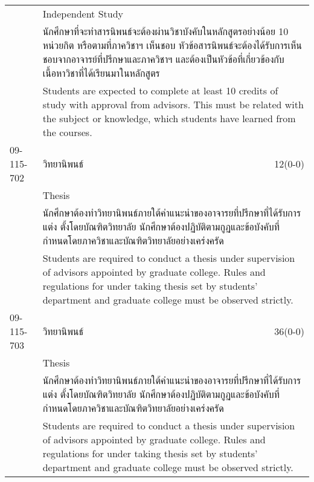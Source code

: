 \begin{longtable}{p{}p{}r{}}
 & Independent Study & \phantom{x} \vspace{3mm} \\*
&  \multicolumn{2}{p{0.75\textwidth}}{นักศึกษาที่จะทำสารนิพนธ์จะต้องผ่านวิชาบังคับในหลักสูตรอย่างน้อย 10 หน่วยกิต หรือตามที่ภาควิชาฯ เห็นชอบ หัวข้อสารนิพนธ์จะต้องได้รับการเห็นชอบจากอาจารย์ที่ปรึกษาและภาควิชาฯ และต้องเป็นหัวข้อที่เกี่ยวข้องกับเนื้อหาวิชาที่ได้เรียนมาในหลักสูตร } \vspace{3mm} \\*
&  \multicolumn{2}{p{0.75\textwidth}}{Students are expected to complete at least 10 credits of study with approval from advisors. This must be related with the subject or knowledge, which students have learned from the courses.} \vspace{8mm} \\*
09-115-702 & วิทยานิพนธ์ & 12(0-0)\\*
 & Thesis & \phantom{x} \vspace{3mm} \\*
&  \multicolumn{2}{p{0.75\textwidth}}{นักศึกษาต้องทำวิทยานิพนธ์ภายใต้คำแนะนำของอาจารยที่ปรึกษาที่ได้รับการแต่ง ตั้งโดยบัณฑิตวิทยาลัย นักศึกษาต้องปฏิบัติตามกูฏและข้อบังคับที่กำหนดโดยภาควิชาและบัณฑิตวิทยาลัยอย่างเคร่งครัด} \vspace{3mm} \\*
&  \multicolumn{2}{p{0.75\textwidth}}{Students are required to conduct a thesis under supervision of advisors appointed by graduate college. Rules and regulations for under taking thesis set by students’ department and graduate college must be observed strictly.} \vspace{8mm} \\*
09-115-703 & วิทยานิพนธ์ & 36(0-0)\\*
 & Thesis & \phantom{x} \vspace{3mm} \\*
&  \multicolumn{2}{p{0.75\textwidth}}{นักศึกษาต้องทำวิทยานิพนธ์ภายใต้คำแนะนำของอาจารยที่ปรึกษาที่ได้รับการแต่ง ตั้งโดยบัณฑิตวิทยาลัย นักศึกษาต้องปฏิบัติตามกูฏและข้อบังคับที่กำหนดโดยภาควิชาและบัณฑิตวิทยาลัยอย่างเคร่งครัด} \vspace{3mm} \\*
&  \multicolumn{2}{p{0.75\textwidth}}{Students are required to conduct a thesis under supervision of advisors appointed by graduate college. Rules and regulations for under taking thesis set by students’ department and graduate college must be observed strictly.} \vspace{8mm} \\*
\end{longtable}
